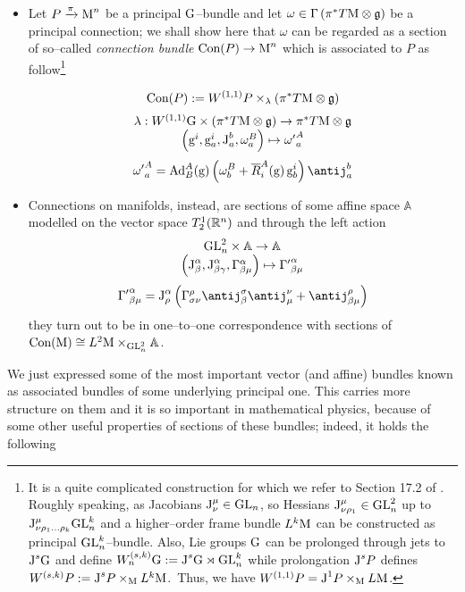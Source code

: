 \begin{example}
\begin{itemize}
\item Let $P\xrightarrow{\pi}\text{\normalfont M}^n$ be a principal $\text{\normalfont G}$--bundle and let $\omega\in\Gamma\left(\pi^*T\text{\normalfont M}\otimes\mathfrak{g}\right)$ be a principal connection; we shall show here that $\omega$ can be regarded as a section of so--called \emph{connection bundle} $\text{\normalfont Con}(P)\to\text{\normalfont M}^n$ which is associated to $P$ as follow\footnote{It is a quite complicated construction for which we refer to Section 17.2 of \cite{fatib}. Roughly speaking, as Jacobians $\text{\normalfont J}^\mu_\nu\in\text{\normalfont GL}_n$, so Hessians $\text{\normalfont J}^\mu_{\nu\rho_1}\in\text{\normalfont GL}_n^2$ up to $\text{\normalfont J}^\mu_{\nu\rho_1\hdots\rho_k}\text{\normalfont GL}_n^k$ and a higher--order frame bundle $L^k\text{\normalfont M}$ can be constructed as principal $\text{\normalfont GL}_n^k$--bundle. Also, Lie groups $\text{\normalfont G}$ can be prolonged through jets to $\text{\normalfont J}^s\text{\normalfont G}$ and define $W^{(s,k)}_n\text{\normalfont G}:=\text{\normalfont J}^s\text{\normalfont G}\rtimes\text{\normalfont GL}_n^k$ while prolongation $\text{\normalfont J}^sP$ defines $W^{(s,k)}P:=\text{\normalfont J}^sP\times_{\text{\normalfont M}} L^k\text{\normalfont M}$.\, Thus, we have $W^{(1,1)}P=\text{\normalfont J}^1P\times_{\text{\normalfont M}} L\text{\normalfont M}$.}

$$\text{\normalfont Con}(P):=W^{(1,1)}P\times_\lambda(\pi^*T\text{\normalfont M}\otimes\mathfrak{g})$$
$$\begin{matrix}
    \lambda:W^{(1,1)}\text{\normalfont G}\times\left(\pi^*T\text{\normalfont M}\otimes\mathfrak{g}\right)\to\pi^*T\text{\normalfont M}\otimes\mathfrak{g}\\
    \left(\text{\normalfont g}^i,\text{\normalfont g}^i_a,\text{\normalfont J}^b_a,\omega_a^B\right)\mapsto{\omega'}^A_a
\end{matrix}$$
$${\omega'}^A_a=\Ad^A_B(\g)\left(\omega^B_b+\overline{R}^A_i(\g)\,\g^i_b\right)\antij^b_a$$


\item Connections on manifolds, instead, are sections of some affine space $\mathbb{A}$ modelled on the vector space $T^1_2(\mathbb{R}^n)$ and through the left action
$$\begin{matrix}
    \text{\normalfont GL}_n^2\times\mathbb{A}\to\mathbb{A}\\
    \left(\text{\normalfont J}^\alpha_\beta,\text{\normalfont J}^\alpha_{\beta\gamma},\Gamma^\alpha_{\beta\mu}\right)\mapsto{\Gamma'}^\alpha_{\beta\mu}
\end{matrix}$$
$${\Gamma'}^\alpha_{\beta\mu}=\J^\alpha_\rho\left(\Gamma^\rho_{\sigma\nu}\antij^\sigma_\beta\antij^\nu_\mu+\antij^\rho_{\beta\mu}\right)$$
they turn out to be in one--to--one correspondence with sections of \,$\text{\normalfont Con}(\text{\normalfont M})\cong L^2\text{\normalfont M}\times_{\text{\normalfont GL}_n^2}\mathbb{A}$.
    \end{itemize}
\end{example}

We just expressed some of the most important vector (and affine) bundles known as associated bundles of some underlying principal one. This carries more structure on them and it is so important in mathematical physics, because of some other useful properties of sections of these bundles; indeed, it holds the following

